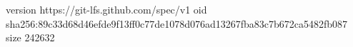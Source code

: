 version https://git-lfs.github.com/spec/v1
oid sha256:89c33d68d46efde9f13ff0c77de1078d076ad13267fba83c7b672ca5482fb087
size 242632
